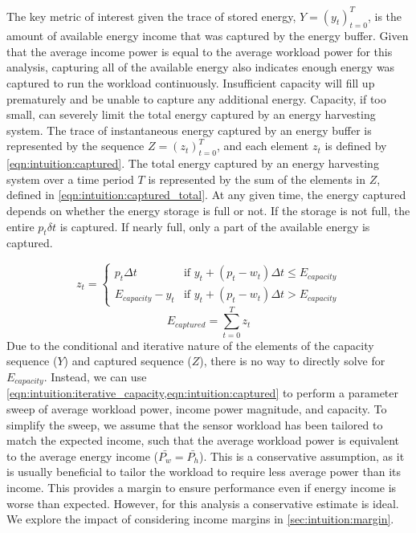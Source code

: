 The key metric of interest given the trace of stored energy, $Y = (y_t)_{t=0}^T$, is
the amount of available energy income that was captured by the energy buffer.
Given that the average income power is equal to the average workload power for this analysis, capturing all of the available energy also indicates enough energy was captured to run the workload continuously.
Insufficient capacity will fill up prematurely and be unable to capture any additional energy.
Capacity, if too small, can severely limit the total energy captured by an energy harvesting system.
The trace of instantaneous energy captured by an energy buffer is represented by the sequence $Z = (z_t)^T_{t=0}$, and each element $z_t$ is defined by \cref{eqn:intuition:captured}. The total energy captured by an energy harvesting system over a time period $T$ is represented by the sum of the elements in $Z$, defined in \cref{eqn:intuition:captured_total}.
At any given time, the energy captured depends on whether the energy storage is full or not. If the storage is not full, the entire $p_t \delta t$ is captured. If nearly full, only a part of the available energy is captured. 

\begin{equation} \label{eqn:intuition:captured}
    z_t = \begin{cases}
        p_t \Delta t & \text{if $y_t + (p_t - w_t) \Delta t \leq E_{capacity}$} \\
        E_{capacity} - y_t & \text{if $y_t + (p_t - w_t) \Delta t > E_{capacity}$}
    \end{cases}
\end{equation}
\begin{equation} \label{eqn:intuition:captured_total}
    E_{captured} = \sum^T_{t=0} z_t
\end{equation}
Due to the conditional and iterative nature of the elements of the capacity sequence ($Y$) and captured sequence ($Z$), there is no way to directly solve for $E_{capacity}$.
Instead, we can use \cref{eqn:intuition:iterative_capacity,eqn:intuition:captured} to perform a parameter sweep of average workload power, income power magnitude, and capacity.
To simplify the sweep, we assume that the sensor workload has been tailored to match the expected income, such that the average workload power is equivalent to the average energy income ($\bar{P_w} = \bar{P_h}$).
This is a conservative assumption, as it is usually beneficial to tailor the workload to require less average power than its income.
This provides a margin to ensure performance even if energy income is worse than expected. However, for this analysis a conservative estimate is ideal. We explore the impact of considering income margins in \cref{sec:intuition:margin}.

